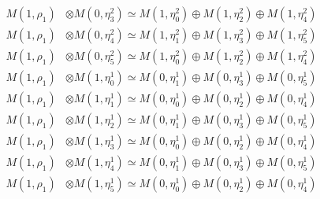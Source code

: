 \begin{align*}
M(1,\rho_{1}) &\otimes M(0,\eta^{2}_{3}) \simeq M(1,\eta^{2}_{0}) \oplus M(1,\eta^{2}_{2}) \oplus M(1,\eta^{2}_{4}) \\
M(1,\rho_{1}) &\otimes M(0,\eta^{2}_{4}) \simeq M(1,\eta^{2}_{1}) \oplus M(1,\eta^{2}_{3}) \oplus M(1,\eta^{2}_{5}) \\
M(1,\rho_{1}) &\otimes M(0,\eta^{2}_{5}) \simeq M(1,\eta^{2}_{0}) \oplus M(1,\eta^{2}_{2}) \oplus M(1,\eta^{2}_{4}) \\
M(1,\rho_{1}) &\otimes M(1,\eta^{1}_{0}) \simeq M(0,\eta^{1}_{1}) \oplus M(0,\eta^{1}_{3}) \oplus M(0,\eta^{1}_{5}) \\
M(1,\rho_{1}) &\otimes M(1,\eta^{1}_{1}) \simeq M(0,\eta^{1}_{0}) \oplus M(0,\eta^{1}_{2}) \oplus M(0,\eta^{1}_{4}) \\
M(1,\rho_{1}) &\otimes M(1,\eta^{1}_{2}) \simeq M(0,\eta^{1}_{1}) \oplus M(0,\eta^{1}_{3}) \oplus M(0,\eta^{1}_{5}) \\
M(1,\rho_{1}) &\otimes M(1,\eta^{1}_{3}) \simeq M(0,\eta^{1}_{0}) \oplus M(0,\eta^{1}_{2}) \oplus M(0,\eta^{1}_{4}) \\
M(1,\rho_{1}) &\otimes M(1,\eta^{1}_{4}) \simeq M(0,\eta^{1}_{1}) \oplus M(0,\eta^{1}_{3}) \oplus M(0,\eta^{1}_{5}) \\
M(1,\rho_{1}) &\otimes M(1,\eta^{1}_{5}) \simeq M(0,\eta^{1}_{0}) \oplus M(0,\eta^{1}_{2}) \oplus M(0,\eta^{1}_{4}) \\
\end{align*}

